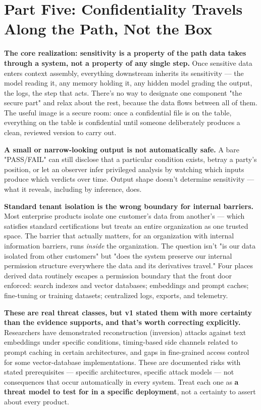 \section{Part Five: Confidentiality Travels Along the Path, Not the Box}

\textbf{The core realization: sensitivity is a property of the path data takes through a system, not a property of any single step.} Once sensitive data enters context assembly, everything downstream inherits its sensitivity --- the model reading it, any memory holding it, any hidden model grading the output, the logs, the step that acts. There's no way to designate one component "the secure part" and relax about the rest, because the data flows between all of them. The useful image is a secure room: once a confidential file is on the table, everything on the table is confidential until someone deliberately produces a clean, reviewed version to carry out.

\textbf{A small or narrow-looking output is not automatically safe.} A bare "PASS/FAIL" can still disclose that a particular condition exists, betray a party's position, or let an observer infer privileged analysis by watching which inputs produce which verdicts over time. Output shape doesn't determine sensitivity --- what it reveals, including by inference, does.

\textbf{Standard tenant isolation is the wrong boundary for internal barriers.} Most enterprise products isolate one customer's data from another's --- which satisfies standard certifications but treats an entire organization as one trusted space. The barrier that actually matters, for an organization with internal information barriers, runs \emph{inside} the organization. The question isn't "is our data isolated from other customers" but "does the system preserve our internal permission structure everywhere the data and its derivatives travel." Four places derived data routinely escapes a permission boundary that the front door enforced: search indexes and vector databases; embeddings and prompt caches; fine-tuning or training datasets; centralized logs, exports, and telemetry.

\textbf{These are real threat classes, but v1 stated them with more certainty than the evidence supports, and that's worth correcting explicitly.} Researchers have demonstrated reconstruction (inversion) attacks against text embeddings under specific conditions, timing-based side channels related to prompt caching in certain architectures, and gaps in fine-grained access control for some vector-database implementations. These are documented risks with stated prerequisites --- specific architectures, specific attack models --- not consequences that occur automatically in every system. Treat each one as \textbf{a threat model to test for in a specific deployment}, not a certainty to assert about every product.

